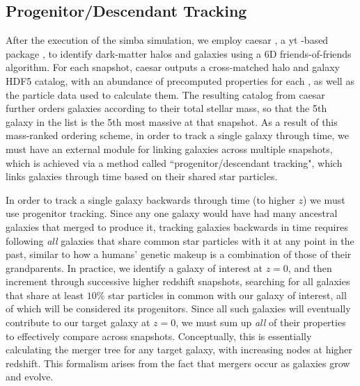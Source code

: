 \documentclass[twocolumn, linenumbers]{aastex631}
\newcommand{\simba}[0]{{\sc simba} }
\newcommand{\yt}[0]{{\sc yt} }
\newcommand{\salad}[0]{{\sc caesar} }
\begin{document}
\subsection{Progenitor/Descendant Tracking}
\label{ssec:prog}

After the execution of the \simba simulation, we employ \salad \citep{salad}, a \yt\!\!-based package \citep{yt}, to identify dark-matter halos and galaxies using a 6D friends-of-friends algorithm.  For each snapshot, \salad outputs a cross-matched halo and galaxy HDF5 catalog, with an abundance of precomputed properties for each \citep{simba}, as well as the particle data used to calculate them.  The resulting catalog from \salad further orders galaxies according to their total stellar mass, so that the 5th galaxy in the list is the 5th most massive at that snapshot.  As a result of this mass-ranked ordering scheme, in order to track a single galaxy through time, we must have an external module for linking galaxies across multiple snapshots, which is achieved via a method called ``progenitor/descendant tracking", which links galaxies through time based on their shared star particles.


In order to track a single galaxy backwards through time (to higher $z$) we must use progenitor tracking.  Since any one galaxy would have had many ancestral galaxies that merged to produce it, tracking galaxies backwards in time requires following \textit{all} galaxies that share common star particles with it at any point in the past, similar to how a humans' genetic makeup is a combination of those of their grandparents.  In practice, we identify a galaxy of interest at $z=0$, and then increment through successive higher redshift snapshots, searching for all galaxies that share at least $10\%$ star particles in common with our galaxy of interest, all of which will be considered its progenitors.  Since all such galaxies will eventually contribute to our target galaxy at $z=0$, we must sum up \textit{all} of their properties to effectively compare across snapshots.  Conceptually, this is essentially calculating the merger tree for any target galaxy, with increasing nodes at higher redshift.  This formalism arises from the fact that mergers occur as galaxies grow and evolve. 
\end{document}
